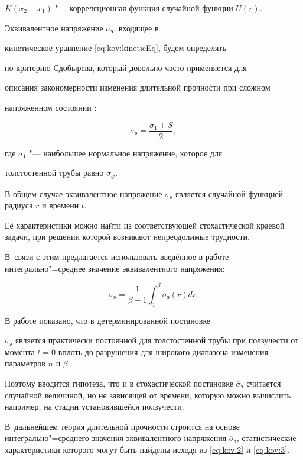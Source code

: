 $K(x_2-x_1)$ "---  корреляционная функция случайной функции $U(r)$.



Эквивалентное напряжение $\sigma_{\text{э}}$, входящее в

кинетическое уравнение \eqref{eq:kov:kineticEq}, будем определять

по критерию Сдобырева, который довольно часто применяется для

описания закономерности изменения длительной прочности при сложном

напряженном состоянии \cite{popovkoval:bib:Sdobyrev}:

\[

\sigma_{\text{э}}=\frac{\sigma_1+S}{2},

\]

где $\sigma_1$ "---  наибольшее нормальное напряжение, которое для

толстостенной трубы равно $\sigma _\varphi$.



В общем случае эквивалентное напряжение $\sigma_{\text{э}}$ является случайной функцией радиуса $r$ и времени $t$. 

Её характеристики можно найти из соответствующей стохастической краевой задачи, при решении которой возникают непреодолимые трудности. 

В~связи с этим предлагается использовать введённое в работе  \cite{popovkoval:bib:Lokos} интегрально"=среднее значение эквивалентного напряжения:

\begin{equation}

\overline{\sigma}_{\text{э}}=\frac{1}{\beta-1} \int _1^{\beta}{\sigma_{\text{э}}(r)dr}.\label{eq:kov:9}

\end{equation}



В работе \cite{popovkoval:bib:RadBash}   показано, что в детерминированной постановке

$\sigma_{\text{э}}$ является практически постоянной для  толстостенной трубы при ползучести от момента $t=0$ вплоть до разрушения для широкого диапазона изменения параметров $n$ и $\beta$. 

Поэтому вводится гипотеза, что и  в стохастической постановке $\overline{\sigma}_{\text{э}}$ считается случайной величиной, но не зависящей от времени, которую можно вычислить, например, на стадии установившейся ползучести.  

В~дальнейшем теория длительной прочности строится на основе интегрально"=среднего значения  эквивалентного напряжения $\overline{\sigma}_{\text{э}}$, статистические характеристики которого могут быть найдены исходя из \eqref{eq:kov:2} и \eqref{eq:kov:3}.



